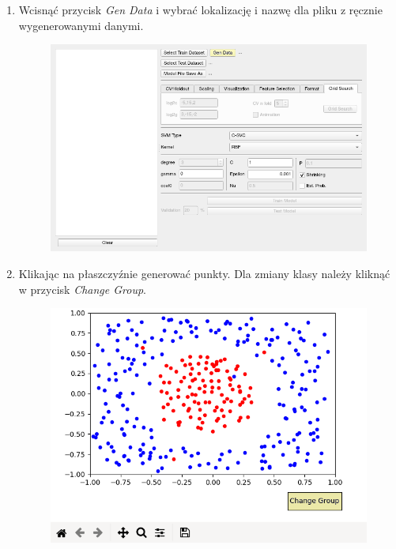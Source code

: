 \documentclass[paper=a4, fontsize=11pt]{scrartcl} %
\numberwithin{equation}{section} %
\numberwithin{figure}{section} %
\begin{document}
\begin{enumerate}[label={\textbf{Krok \theenumi :}},leftmargin=*]
    \item Wcisnąć przycisk \textit{Gen Data} i wybrać lokalizację i nazwę dla pliku z ręcznie
        wygenerowanymi danymi.

    \begin{figure}[H]
        \begin{center}
            \includegraphics[scale=0.7]{./img/ex3_st1.png}
        \end{center}
    \end{figure}

    \newpage
    \item Klikając na płaszczyźnie generować punkty. Dla zmiany klasy należy kliknąć w przycisk
        \textit{Change Group}.

    \begin{figure}[H]
        \begin{center}
            \includegraphics[scale=0.6]{./img/ex3_st2.png}
        \end{center}
    \end{figure}


\end{enumerate}
\end{document}
